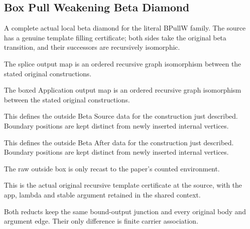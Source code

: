 \subsection{Box Pull Weakening Beta Diamond}
A complete actual local beta diamond for the literal BPullW family. The source has a genuine template filling certificate; both sides take the original beta transition, and their successors are recursively isomorphic.

The splice output map is an ordered recursive graph isomorphism between the stated original constructions.
\par{}

The boxed Application output map is an ordered recursive graph isomorphism between the stated original constructions.
\par{}

This defines the outside Beta Source data for the construction just described. Boundary positions are kept distinct from newly inserted internal vertices.
\par{}

This defines the outside Beta After data for the construction just described. Boundary positions are kept distinct from newly inserted internal vertices.
\par{}

The raw outside box is only recast to the paper's counted environment.
\par{}

This is the actual original recursive template certificate at the source, with the app, lambda and stable argument retained in the shared context.
\par{}

Both reducts keep the same bound-output junction and every original body and argument edge. Their only difference is finite carrier association.
\par{}

